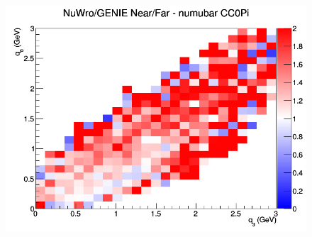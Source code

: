 \begin{figure}[h]
\endminipage
{}
\includegraphics[width=\linewidth]{eff_q0_q3/FGT/ratios/CC0Pi_NuWro_GENIE_numubar_NF_q3_q0.png}
\endminipage
\newline
\end{figure}
\clearpage
